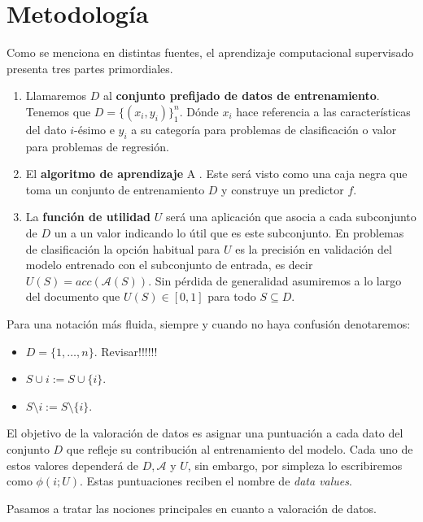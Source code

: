 \chapter{Metodología}
\justifying

Como se menciona en distintas fuentes, el aprendizaje computacional
supervisado presenta tres partes primordiales\cite{dataShapley,betaShapley}.
\begin{enumerate}
  \item  Llamaremos $D$ al \textbf{conjunto prefijado de datos de
  entrenamiento}. Tenemos que $D = \{ (x_i, y_i) \}_1^n$. Dónde $x_i$ hace
  referencia a las características del dato $i$-ésimo e $y_i$ a su
  categoría para problemas de clasificación o valor para problemas de
  regresión.
  
  \item El \textbf{algoritmo de aprendizaje}  A . Este será visto como
  una caja negra que toma un conjunto de entrenamiento $D$ y construye un
  predictor $f$.
  
  \item La \textbf{función de utilidad} $U$ será una aplicación
  que asocia a cada subconjunto de $D$ un a un valor indicando lo útil que
  es este subconjunto. En problemas de clasificación la opción
  habitual para $U$ es la precisión en validación del modelo entrenado
  con el subconjunto de entrada, es decir $U (S) = acc (\mathcal{A}
  (S)) .$ Sin pérdida de generalidad asumiremos a lo largo del documento
  que $U (S) \in [0, 1]$ para todo $S \subseteq D$.
\end{enumerate}
Para una notación más fluida, siempre y cuando no haya confusión
denotaremos:
\begin{itemize}
  \item $D = \{ 1, \ldots, n \}$. Revisar!!!!!!
  
  \item $S \cup i := S \cup \{ i \}$.
  
  \item $S \setminus i := S \setminus \{ i \}$.
\end{itemize}
El objetivo de la valoración de datos es asignar una puntuación a cada
dato del conjunto $D$ que refleje su contribución al entrenamiento del
modelo. Cada uno de estos valores dependerá de $D, \mathcal{A}$ y $U$, sin
embargo, por simpleza lo escribiremos como $\phi (i ; U)$. Estas puntuaciones
reciben el nombre de \textit{data values}.

Pasamos a tratar las nociones principales en cuanto a valoración de datos.

